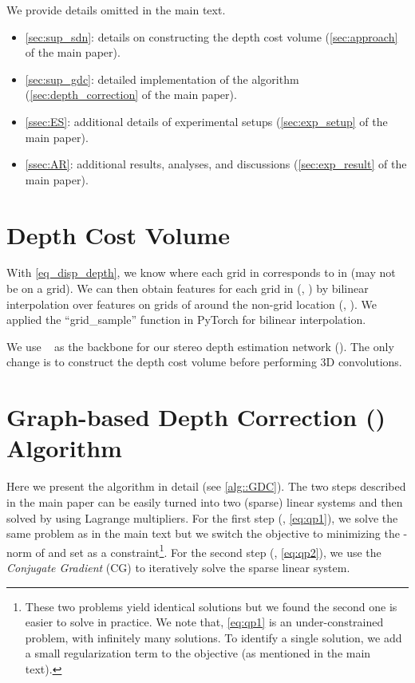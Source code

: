 We provide details omitted in the main text.

\begin{itemize}
	\item \autoref{sec:sup_sdn}: details on constructing the depth cost volume (\autoref{sec:approach} of the main paper).
	\item \autoref{sec:sup_gdc}: detailed implementation of the \GDC algorithm (\autoref{sec:depth_correction} of the main paper).
	\item \autoref{ssec:ES}: additional details of experimental setups (\autoref{sec:exp_setup} of the main paper).
	\item \autoref{ssec:AR}: additional results, analyses, and discussions (\autoref{sec:exp_result} of the main paper).
\end{itemize}

\section{Depth Cost Volume}
\label{sec:sup_sdn}
With \autoref{eq_disp_depth}, we know where each grid  in  corresponds to in  (may not be on a grid). We can then obtain features for each grid in  (\ie, ) by bilinear interpolation over features on grids of  around the non-grid location (\ie, ). We applied the ``grid\_sample'' function in PyTorch for bilinear interpolation.

We use \PSMNet~\citep{chang2018pyramid} as the backbone for our stereo depth estimation network (\SDN). The only change is to construct the depth cost volume before performing 3D convolutions.

\section{Graph-based Depth Correction (\GDC) Algorithm}
\label{sec:sup_gdc}
Here we present the \GDC algorithm in detail (see \autoref{alg::GDC}). The two steps described in the main paper can be easily turned into two (sparse) linear systems and then solved by using Lagrange multipliers. For the first step (\ie, \autoref{eq:qp1}), we solve the same problem as in the main text but we switch the objective to minimizing the -norm of  and set  as a constraint\footnote{These two problems yield identical solutions but we found the second one is easier to solve in practice. We note that, \autoref{eq:qp1} is an under-constrained problem, with infinitely many solutions. To identify a single solution, we add a small  regularization term to the objective (as mentioned in the main text). }. For the second step (\ie, \autoref{eq:qp2}), we use the \emph{Conjugate Gradient} (CG) to iteratively solve the sparse linear system.

